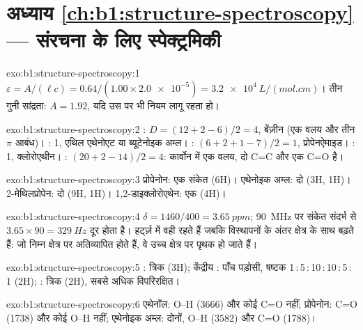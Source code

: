 \section*{अध्याय \ref{ch:b1:structure-spectroscopy} --- संरचना के लिए स्पेक्ट्रमिकी}

\begin{solution}{exo:b1:structure-spectroscopy:1}
$\varepsilon = A/(\ell c) = 0.64/(1.00 \times \num{2.0e-5}) =
\qty{3.2e4}{L/(mol.cm)}$। तीन गुनी सांद्रता: $A = 1.92$, यदि
उस  पर भी नियम लागू रहता हो।
\end{solution}

\begin{solution}{exo:b1:structure-spectroscopy:2}
: $D = (12 + 2 - 6)/2 = 4$, बेंज़ीन (एक वलय और तीन $\pi$ आबंध)।
: 1, एथिल एथेनोएट या ब्यूटेनोइक अम्ल। : $(6 + 2 + 1
- 7)/2 = 1$, प्रोपेनऐमाइड। : 1, क्लोरोएथीन। :
$(20 + 2 - 14)/2 = 4$: कार्वोन में एक वलय, दो C=C और एक C=O है।
\end{solution}

\begin{solution}{exo:b1:structure-spectroscopy:3}
प्रोपेनोन: एक संकेत (6H)। एथेनोइक अम्ल: दो (3H, 1H)। 2-मेथिलप्रोपेन:
दो (9H, 1H)। 1,2-डाइक्लोरोएथेन: एक (4H)।
\end{solution}

\begin{solution}{exo:b1:structure-spectroscopy:4}
$\delta = 1460/400 = \qty{3.65}{ppm}$; \qty{90}{MHz} पर संकेत संदर्भ से
$3.65 \times 90 = \qty{329}{Hz}$ दूर होता है। 
हर्ट्ज़ में वही रहते हैं जबकि विस्थापनों के अंतर क्षेत्र के साथ बढ़ते हैं:
जो  निम्न क्षेत्र पर अतिव्यापित होते हैं, वे उच्च क्षेत्र पर पृथक हो जाते हैं।
\end{solution}

\begin{solution}{exo:b1:structure-spectroscopy:5}
: त्रिक (3H); केंद्रीय : पाँच पड़ोसी, षष्टक
1\,:\,5\,:\,10\,:\,10\,:\,5\,:\,1 (2H); : त्रिक (2H), सबसे अधिक
विपरिरक्षित।
\end{solution}

\begin{solution}{exo:b1:structure-spectroscopy:6}
एथेनॉल: O--H (3666) और कोई C=O नहीं; प्रोपेनोन: C=O (1738) और कोई O--H नहीं;
एथेनोइक अम्ल: दोनों, O--H (3582) और C=O (1788)।
\end{solution}

